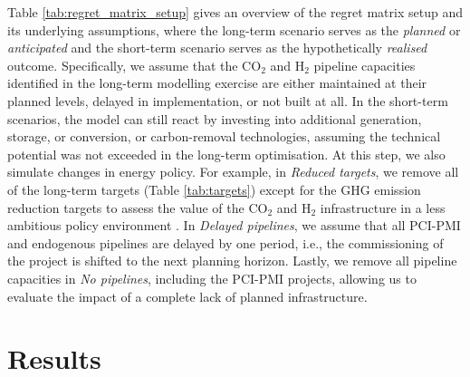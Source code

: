 \documentclass[pdflatex,sn-nature]{sn-jnl}%
\theoremstyle{thmstyleone}%
\theoremstyle{thmstyletwo}%
\theoremstyle{thmstylethree}%
\begin{document}
Table \ref{tab:regret_matrix_setup} gives an overview of the regret matrix setup and its underlying assumptions, where the long-term scenario serves as the \textit{planned} or \textit{anticipated} and the short-term scenario serves as the hypothetically \textit{realised} outcome. Specifically, we assume that the CO$_2$ and H$_2$ pipeline capacities identified in the long-term modelling exercise are either maintained at their planned levels, delayed in implementation, or not built at all.
In the short-term scenarios, the model can still react by investing into additional generation, storage, or conversion, or carbon-removal technologies, assuming the technical potential was not exceeded in the long-term optimisation. At this step, we also simulate changes in energy policy. For example, in \textit{Reduced targets}, we remove all of the long-term targets (Table \ref{tab:targets}) except for the GHG emission reduction targets to assess the value of the CO$_2$ and H$_2$ infrastructure in a less ambitious policy environment \cite{europeancourtofauditorsEUsIndustrialPolicy2024}. In \textit{Delayed pipelines}, we assume that all PCI-PMI and endogenous pipelines are delayed by one period, i.e., the commissioning of the project is shifted to the next planning horizon. Lastly, we remove all pipeline capacities in \textit{No pipelines}, including the PCI-PMI projects, allowing us to evaluate the impact of a complete lack of planned infrastructure. 

\section*{Results}\label{sec:results}
\end{document}

